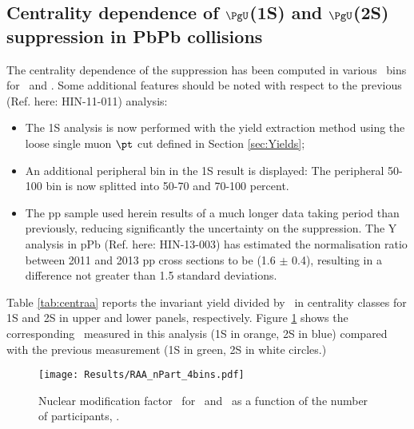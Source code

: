 \vfill\newpage
\subsection{Centrality dependence of \texorpdfstring{$\PgU$}{Y}(1S) and \texorpdfstring{$\PgU$}{Y}(2S) suppression in PbPb collisions}
\label{subsec:raah}
The centrality dependence of the suppression has been computed
in various \Npart\ bins for \PgUa\ and \PgUb. Some additional
features should be noted with respect to the previous (Ref. here:
HIN-11-011) analysis:
\begin{itemize}
\item{The 1S analysis is now performed with the yield extraction
method using the loose single muon $\pt$ cut defined in Section
\ref{sec:Yields};}
\item{An additional peripheral bin in the 1S result is displayed: The
peripheral 50-100 bin is now splitted into 50-70 and 70-100 percent.}
\item{The pp sample used herein results of a much longer data taking
period than previously, reducing significantly the uncertainty on the
suppression. The Y analysis in pPb (Ref. here: HIN-13-003) has
estimated the normalisation ratio between 2011 and 2013 pp cross
sections to be (1.6 $\pm$ 0.4), resulting in a difference not greater
than 1.5 standard deviations.}
\end{itemize}

Table \ref{tab:centraa} reports the invariant yield divided by
\TAA\ in centrality classes for 1S and 2S in upper and lower
panels, respectively. Figure \ref{fig:raacompcent} shows the
corresponding \RAA\ measured in this analysis (1S in orange, 2S in
blue) compared with the previous measurement (1S in green, 2S in white
circles.)


\begin{figure}[h]
\begin{centering}       
  \texttt{[image: Results/RAA\_nPart\_4bins.pdf]}
  \caption{Nuclear modification factor \RAA\ for \PgUa\ and \PgUb\ 
  as a function of the number of participants, \Npart.}
  \label{fig:raacompcent} 
\end{centering}
\end{figure}

